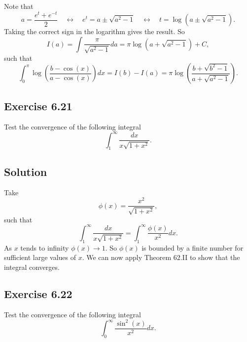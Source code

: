 Note that
\begin{equation*}
    a = \frac{e^t + e^{-t}}{2}
        \quad \leftrightarrow \quad e^t = a \pm \sqrt{a^2 - 1}
        \quad \leftrightarrow \quad t = \log(a \pm \sqrt{a^2 - 1}).
\end{equation*}
Taking the correct sign in the logarithm gives the result.
So
\begin{equation*}
    I(a) = \int \frac{\pi}{\sqrt{a^2 - 1}} da = \pi \log\left(a + \sqrt{a^2 - 1}\right) + C,
\end{equation*}
such that
\begin{equation*}
    \int_0^\pi \log\left(\frac{b - \cos(x)}{a - \cos(x)} \right) dx
        = I(b) - I(a)
        = \pi \log\left( \frac{b + \sqrt{b^2 - 1}}{a + \sqrt{a^2 - 1}} \right).
\end{equation*}


\subsection*{Exercise 6.21}

Test the convergence of the following integral
\begin{equation*}
    \int_1^{\infty} \frac{dx}{x\sqrt{1 + x^2}}.
\end{equation*}

\subsection*{Solution}

Take
\begin{equation*}
    \phi(x) = \frac{x^2}{\sqrt{1 + x^2}},
\end{equation*}
such that
\begin{equation*}
    \int_1^{\infty} \frac{dx}{x\sqrt{1 + x^2}} = \int_1^{\infty} \frac{\phi(x)}{x^2} dx.
\end{equation*}
As $x$ tends to infinity $\phi(x) \to 1$.
So $\phi(x)$ is bounded by a finite number for sufficient large values of $x$.
We can now apply Theorem 62.II to show that the integral converges.


\subsection*{Exercise 6.22}

Test the convergence of the following integral
\begin{equation*}
    \int_0^{\infty} \frac{\sin^2(x)}{x^2} dx.
\end{equation*}

